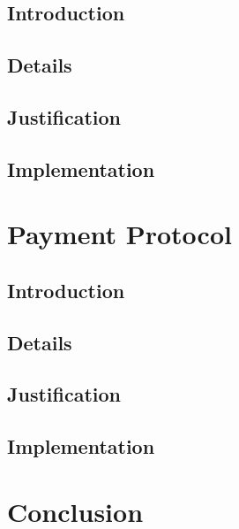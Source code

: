\documentclass[a4paper,11pt]{article}
\begin{document}
\subsection{Introduction}

\subsection{Details}

\subsection{Justification}

\subsection{Implementation}

\section{Payment Protocol}

\subsection{Introduction}

\subsection{Details}

\subsection{Justification}

\subsection{Implementation}

\section{Conclusion}
\end{document}
